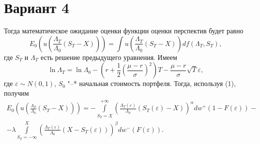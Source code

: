 \documentclass{article}
\begin{document}
\section*{Вариант 4}
Тогда математическое ожидание оценки функции оценки перспектив будет равно
\begin{equation*}
E_0\left(u\left(\frac{\Lambda_T}{\Lambda_0}(S_T-X)\right)\right)=\int u\left(\frac{\Lambda_T}{\Lambda_0}(S_T-X)\right)df(\Lambda_T,S_T),
\end{equation*}
где $S_T$ и $\Lambda_T$ есть решение предыдущего уравнения. Имеем
\begin{equation}
\ln\Lambda_T=\ln\Lambda_0-\left(r+\frac{1}{2}\left(\frac{\mu-r}{\sigma}\right)^2\right)T-\frac{\mu-r}{\sigma}\sqrt{T}\varepsilon,
\end{equation}
где $\varepsilon\sim N(0,1)$, $S_0$ "--* начальная стоимость портфеля. Тогда, используя (1), получим
\begin{multline}
E_0\left(u\left(\frac{\Lambda_T}{\Lambda_0}(S_T-X)\right)\right)=-\int\limits_{S_T=X}^{+\infty}\left(\frac{\Lambda_T(\varepsilon)}{\Lambda_0}(S_T(\varepsilon)-X)\right)^\alpha dw^+(1-F(\varepsilon))-\\
-\lambda\int\limits_{S_T=-\infty}^X\left(\frac{\Lambda_T(\varepsilon)}{\Lambda_0}(X-S_T(\varepsilon))\right)^\beta dw^-(F(\varepsilon)).
\end{multline}
\end{document}
